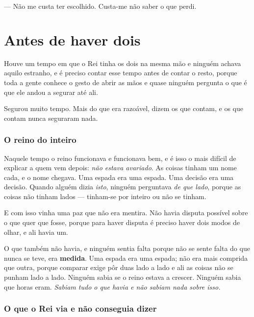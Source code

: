 \documentclass[livro.tex]{subfiles}
\begin{document}
\medskip

--- Não me custa ter escolhido. Custa-me não saber o que perdi.


\chapter{Antes de haver dois}

Houve um tempo em que o Rei tinha os dois na mesma mão e ninguém achava aquilo estranho, e é
preciso contar esse tempo antes de contar o resto, porque toda a gente conhece o gesto de abrir as
mãos e quase ninguém pergunta o que é que ele andou a segurar até ali.

\medskip

Segurou muito tempo. Mais do que era razoável, dizem os que contam, e os que contam nunca
seguraram nada.

\subsection*{O reino do inteiro}

Naquele tempo o reino funcionava e funcionava bem, e é isso o mais difícil de explicar a quem
vem depois: \emph{não estava avariado}. As coisas tinham um nome cada, e o nome chegava. Uma
espada era uma espada. Uma decisão era uma decisão. Quando alguém dizia \emph{isto}, ninguém
perguntava \emph{de que lado}, porque as coisas não tinham lados --- tinham-se por inteiro ou não
se tinham.

\medskip

E com isso vinha uma paz que não era mentira. Não havia disputa possível sobre o que quer que
fosse, porque para haver disputa é preciso haver dois modos de olhar, e ali havia um.

\medskip

O que também não havia, e ninguém sentia falta porque não se sente falta do que nunca se teve, era
\textbf{medida}. Uma espada era uma espada; não era mais comprida que outra, porque comparar exige
pôr duas lado a lado e ali as coisas não se punham lado a lado. Ninguém sabia se o reino estava a
crescer. Ninguém sabia que horas eram. \emph{Sabiam tudo o que havia e não sabiam nada sobre isso.}

\subsection*{O que o Rei via e não conseguia dizer}
\end{document}
